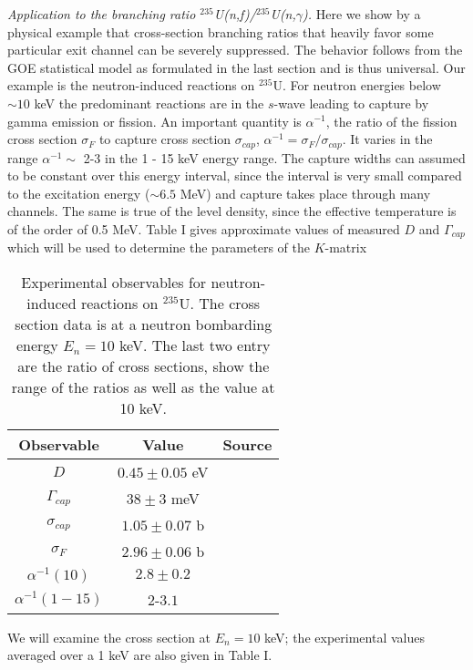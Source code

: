 \documentclass[prl,aps,floatfix,nofootinbib,preprint]{revtex4}
\begin{document}
{\it Application to the branching ratio
$^{235}$U(n,f)/$^{235}$U(n,$\gamma$).}
Here we show by a physical example that cross-section branching ratios that
heavily favor some particular exit channel can be severely suppressed.
The behavior follows from
the GOE statistical model as formulated in the last section and is
thus universal.  Our example is the neutron-induced reactions on $^{235}$U.  
For neutron energies below
$\sim 10$ keV the predominant reactions are in the $s$-wave leading to
capture by gamma emission or fission.
An important quantity is $\alpha^{-1}$, the ratio of the
fission cross section $\sigma_F$ 
to capture cross section $\sigma_{cap}$, $\alpha^{-1} =
\sigma_F/\sigma_{cap}$.  It varies in the range $\alpha^{-1} \sim $ 2-3 
in the 1 - 15 keV energy range\cite{average}. 
The capture widths can assumed
to be constant over this energy interval, since the interval is very small compared
to the excitation energy ($\sim 6.5$ MeV) and capture takes place through
many channels. The same is true of the level density, since the effective
temperature is of the order of 0.5 MeV. Table I gives approximate values of measured
$D$ and $\Gamma_{cap}$ which will be used to determine the parameters of the 
$K$-matrix \cite{D}
%
\begin{table}[htb] 
\begin{center} 
\caption{ Experimental observables for neutron-induced reactions on
$^{235}$U.  The cross section data is at a neutron bombarding energy
$E_n = 10 $ keV.  The last two entry are the ratio of cross sections,
show the range of the ratios as well as the value at 10 keV.}
\label{experiment}
\begin{tabular}{|ccc|} 
\hline 
  Observable  & Value & Source\\
\hline
 $D$     &  $0.45\pm0.05$  eV  &  \cite{ripl,mug}  \\
$\Gamma_{cap}$ &   $38\pm 3$  meV  &  \cite{ripl} \\
$ \sigma_{cap}$  &  $1.05\pm 0.07$ {{b}}  & \cite{endf,corvi} \\
$ \sigma_F $   &    $2.96\pm 0.06$  {b}  & \cite{endf,corvi} \\
$\alpha^{-1}(10)$ &  $2.8\pm 0.2$ & \cite{corvi,footnote} \\
$\alpha^{-1}(1-15)$ &  $2$-$3.1$  & \cite{endf} \\

\hline 
\end{tabular} 
\end{center} 
\end{table} 
We will examine the cross section at $E_n = 10 $ keV; the experimental
values averaged over a 1 keV are also given in Table I.  
\end{document}
